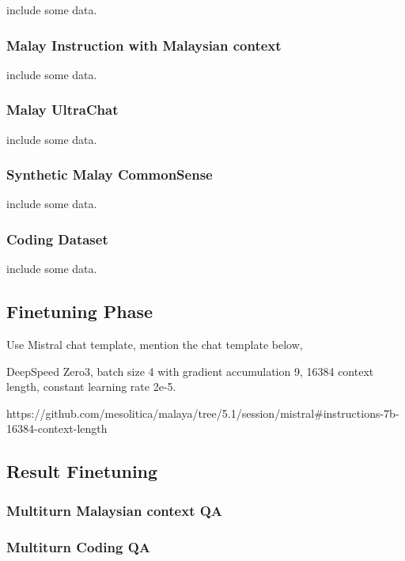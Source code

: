 \documentclass{article}
\begin{document}
include some data.

\subsubsection{Malay Instruction with Malaysian context}

include some data.

\subsubsection{Malay UltraChat}

include some data.

\subsubsection{Synthetic Malay CommonSense}

include some data.

\subsubsection{Coding Dataset}

include some data.

\subsection{Finetuning Phase}

Use Mistral chat template, mention the chat template below,

DeepSpeed Zero3, batch size 4 with gradient accumulation 9, 16384 context length, constant learning rate 2e-5.

https://github.com/mesolitica/malaya/tree/5.1/session/mistral#instructions-7b-16384-context-length

\subsection{Result Finetuning}

\subsubsection{Multiturn Malaysian context QA}

\subsubsection{Multiturn Coding QA}
\end{document}
